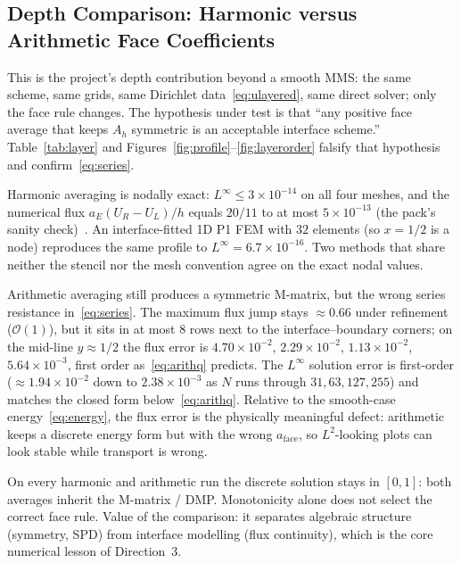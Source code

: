 \documentclass[11pt,a4paper]{article}
\begin{document}
\subsection{Depth Comparison: Harmonic versus Arithmetic Face Coefficients}
This is the project's depth contribution beyond a smooth MMS: the same scheme, same grids, same Dirichlet data~\eqref{eq:ulayered}, same direct solver; only the face rule changes.
The hypothesis under test is that ``any positive face average that keeps \(A_h\) symmetric is an acceptable interface scheme.''
Table~\ref{tab:layer} and Figures~\ref{fig:profile}--\ref{fig:layerorder} falsify that hypothesis and confirm~\eqref{eq:series}.

Harmonic averaging is nodally exact: \(L^\infty\le 3\times 10^{-14}\) on all four meshes, and the numerical flux \(a_E(U_R-U_L)/h\) equals \(20/11\) to at most \(5\times 10^{-13}\) (the pack's sanity check)~\cite{problemPack}.
An interface-fitted 1D P1 FEM with \(32\) elements (so \(x=1/2\) is a node) reproduces the same profile to \(L^\infty=6.7\times 10^{-16}\).
Two methods that share neither the stencil nor the mesh convention agree on the exact nodal values.

Arithmetic averaging still produces a symmetric M-matrix, but the wrong series resistance in~\eqref{eq:series}.
The maximum flux jump stays \(\approx 0.66\) under refinement (\(\mathcal{O}(1)\)), but it sits in at most \(8\) rows next to the interface--boundary corners; on the mid-line \(y\approx 1/2\) the flux error is \(4.70\times 10^{-2}\), \(2.29\times 10^{-2}\), \(1.13\times 10^{-2}\), \(5.64\times 10^{-3}\), first order as~\eqref{eq:arithq} predicts.
The \(L^\infty\) solution error is first-order (\(\approx 1.94\times 10^{-2}\) down to \(2.38\times 10^{-3}\) as \(N\) runs through \(31,63,127,255\)) and matches the closed form below~\eqref{eq:arithq}.
Relative to the smooth-case energy~\eqref{eq:energy}, the flux error is the physically meaningful defect: arithmetic keeps a discrete energy form but with the wrong \(a_{\mathrm{face}}\), so \(L^2\)-looking plots can look stable while transport is wrong.

On every harmonic and arithmetic run the discrete solution stays in \([0,1]\): both averages inherit the M-matrix / DMP.
Monotonicity alone does not select the correct face rule.
Value of the comparison: it separates algebraic structure (symmetry, SPD) from interface modelling (flux continuity), which is the core numerical lesson of Direction~3.
\end{document}
